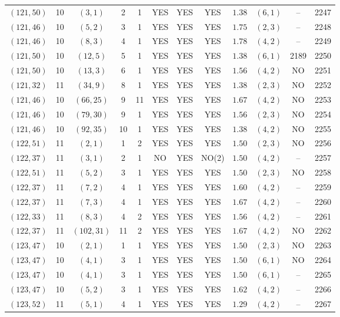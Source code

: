 \begin{longtable}{|c|c|c|c|c|c|c|c|c|c|c|c|}
$(121,50)$ & 10 & $(3,1)$ & 2 & 1 & YES & YES & YES & $1.38$ & $(6,1)$ & -- & 2247\\
$(121,46)$ & 10 & $(5,2)$ & 3 & 1 & YES & YES & YES & $1.75$ & $(2,3)$ & -- & 2248\\
$(121,46)$ & 10 & $(8,3)$ & 4 & 1 & YES & YES & YES & $1.78$ & $(4,2)$ & -- & 2249\\
$(121,50)$ & 10 & $(12,5)$ & 5 & 1 & YES & YES & YES & $1.38$ & $(6,1)$ & 2189 & 2250\\
$(121,50)$ & 10 & $(13,3)$ & 6 & 1 & YES & YES & YES & $1.56$ & $(4,2)$ & NO & 2251\\
$(121,32)$ & 11 & $(34,9)$ & 8 & 1 & YES & YES & YES & $1.38$ & $(2,3)$ & NO & 2252\\
$(121,46)$ & 10 & $(66,25)$ & 9 & 11 & YES & YES & YES & $1.67$ & $(4,2)$ & NO & 2253\\
$(121,46)$ & 10 & $(79,30)$ & 9 & 1 & YES & YES & YES & $1.56$ & $(2,3)$ & NO & 2254\\
$(121,46)$ & 10 & $(92,35)$ & 10 & 1 & YES & YES & YES & $1.38$ & $(4,2)$ & NO & 2255\\
$(122,51)$ & 11 & $(2,1)$ & 1 & 2 & YES & YES & YES & $1.50$ & $(2,3)$ & NO & 2256\\
$(122,37)$ & 11 & $(3,1)$ & 2 & 1 & NO & YES & NO(2) & $1.50$ & $(4,2)$ & -- & 2257\\
$(122,51)$ & 11 & $(5,2)$ & 3 & 1 & YES & YES & YES & $1.50$ & $(2,3)$ & NO & 2258\\
$(122,37)$ & 11 & $(7,2)$ & 4 & 1 & YES & YES & YES & $1.60$ & $(4,2)$ & -- & 2259\\
$(122,37)$ & 11 & $(7,3)$ & 4 & 1 & YES & YES & YES & $1.67$ & $(4,2)$ & -- & 2260\\
$(122,33)$ & 11 & $(8,3)$ & 4 & 2 & YES & YES & YES & $1.56$ & $(4,2)$ & -- & 2261\\
$(122,37)$ & 11 & $(102,31)$ & 11 & 2 & YES & YES & YES & $1.67$ & $(4,2)$ & NO & 2262\\
$(123,47)$ & 10 & $(2,1)$ & 1 & 1 & YES & YES & YES & $1.50$ & $(2,3)$ & NO & 2263\\
$(123,47)$ & 10 & $(4,1)$ & 3 & 1 & YES & YES & YES & $1.50$ & $(6,1)$ & NO & 2264\\
$(123,47)$ & 10 & $(4,1)$ & 3 & 1 & YES & YES & YES & $1.50$ & $(6,1)$ & -- & 2265\\
$(123,47)$ & 10 & $(5,2)$ & 3 & 1 & YES & YES & YES & $1.62$ & $(4,2)$ & -- & 2266\\
$(123,52)$ & 11 & $(5,1)$ & 4 & 1 & YES & YES & YES & $1.29$ & $(4,2)$ & -- & 2267\\

\end{longtable}
